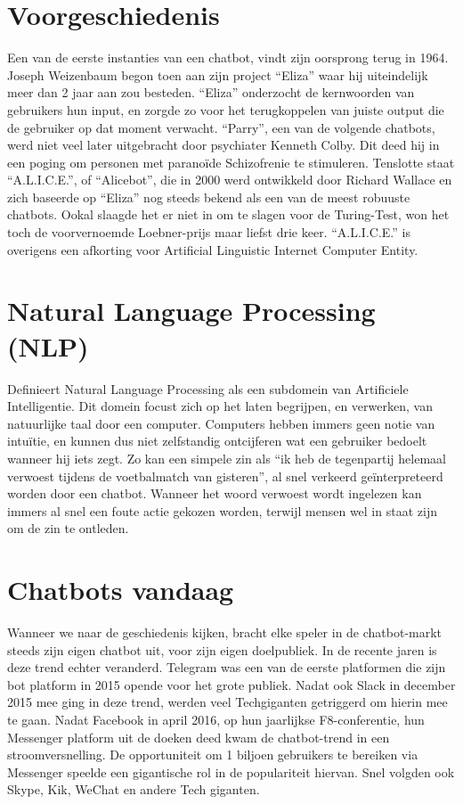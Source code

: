 \section{Voorgeschiedenis}
Een van de eerste instanties van een chatbot, vindt zijn oorsprong terug in 1964. Joseph Weizenbaum \autocite{Weizenbaum1966} begon toen aan zijn project “Eliza” waar hij uiteindelijk meer dan 2 jaar aan zou besteden. “Eliza” onderzocht de kernwoorden van gebruikers hun input, en zorgde zo voor het terugkoppelen van juiste output die de gebruiker op dat moment verwacht. 
“Parry”, een van de volgende chatbots, werd niet veel later uitgebracht door psychiater Kenneth Colby. Dit deed hij in een poging om personen met paranoïde Schizofrenie te stimuleren. 
Tenslotte staat “A.L.I.C.E.”, of “Alicebot”, die in 2000 werd ontwikkeld door Richard Wallace en zich baseerde op “Eliza” nog steeds bekend als een van de meest robuuste chatbots. Ookal slaagde het er niet in om te slagen voor de Turing-Test, won het toch de voorvernoemde Loebner-prijs maar liefst drie keer. “A.L.I.C.E.” is overigens een afkorting voor Artificial Linguistic Internet Computer Entity. 

\section{Natural Language Processing (NLP)}
 \textcite{Seif2018} Definieert Natural Language Processing als een subdomein van Artificiele Intelligentie. Dit domein focust zich op het laten begrijpen, en verwerken, van natuurlijke taal door een computer. Computers hebben immers geen notie van intuïtie, en kunnen dus niet zelfstandig ontcijferen wat een gebruiker bedoelt wanneer hij iets zegt. Zo kan een simpele zin als “ik heb de tegenpartij helemaal verwoest tijdens de voetbalmatch van gisteren”, al snel verkeerd geïnterpreteerd worden door een chatbot. Wanneer het woord verwoest wordt ingelezen kan immers al snel een foute actie gekozen worden, terwijl mensen wel in staat zijn om de zin te ontleden.  

\section{Chatbots vandaag}
Wanneer we naar de geschiedenis kijken, bracht elke speler in de chatbot-markt steeds zijn eigen chatbot uit, voor zijn eigen doelpubliek. In de recente jaren is deze trend echter veranderd. Telegram was een van de eerste platformen die zijn bot platform in 2015 opende voor het grote publiek. Nadat ook Slack in december 2015 mee ging in deze trend, werden veel Techgiganten getriggerd om hierin mee te gaan. Nadat Facebook in april 2016, op hun jaarlijkse F8-conferentie, hun Messenger platform uit de doeken deed kwam de chatbot-trend in een stroomversnelling. De opportuniteit om 1 biljoen gebruikers te bereiken  via Messenger speelde een gigantische rol in de populariteit hiervan. Snel volgden ook Skype, Kik, WeChat en andere Tech giganten. 


\lipsum[7-20]

